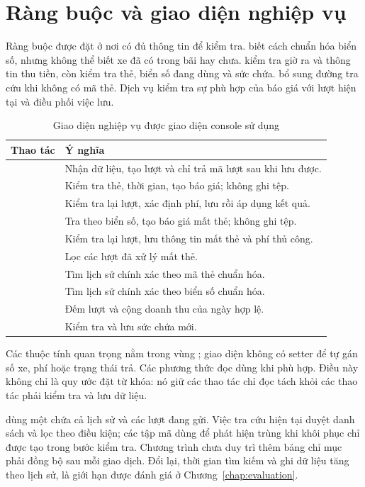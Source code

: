 \section{Ràng buộc và giao diện nghiệp vụ}
Ràng buộc được đặt ở nơi có đủ thông tin để kiểm tra.  biết cách chuẩn hóa biển số, nhưng không thể biết xe đã có trong bãi hay chưa.  kiểm tra giờ ra và thông tin thu tiền, còn  kiểm tra thẻ, biển số đang dùng và sức chứa.  bổ sung đường tra cứu khi không có mã thẻ. Dịch vụ kiểm tra sự phù hợp của báo giá với lượt hiện tại và điều phối việc lưu.

\begin{table}[H]
\centering\small
\caption{Giao diện nghiệp vụ được giao diện console sử dụng}
\label{tab:service-api}
\begin{tabularx}{\textwidth}{l Y}
\toprule
Thao tác & Ý nghĩa\\
\midrule
{} & Nhận dữ liệu, tạo lượt và chỉ trả mã lượt sau khi lưu được.\\
 & Kiểm tra thẻ, thời gian, tạo báo giá; không ghi tệp.\\
 & Kiểm tra lại lượt, xác định phí, lưu rồi áp dụng kết quả.\\
 & Tra theo biển số, tạo báo giá mất thẻ; không ghi tệp.\\
 & Kiểm tra lại lượt, lưu thông tin mất thẻ và phí thủ công.\\
 & Lọc các lượt đã xử lý mất thẻ.\\
 & Tìm lịch sử chính xác theo mã thẻ chuẩn hóa.\\
 & Tìm lịch sử chính xác theo biển số chuẩn hóa.\\
 & Đếm lượt và cộng doanh thu của ngày hợp lệ.\\
 & Kiểm tra và lưu sức chứa mới.\\
\bottomrule
\end{tabularx}
\end{table}

Các thuộc tính quan trọng nằm trong vùng ; giao diện không có setter để tự gán số xe, phí hoặc trạng thái trả. Các phương thức đọc dùng  khi phù hợp. Điều này không chỉ là quy ước đặt từ khóa: nó giữ các thao tác chỉ đọc tách khỏi các thao tác phải kiểm tra và lưu dữ liệu.

 dùng một  chứa cả lịch sử và các lượt đang gửi. Việc tra cứu hiện tại duyệt danh sách và lọc theo điều kiện; các tập mã dùng để phát hiện trùng khi khôi phục chỉ được tạo trong bước kiểm tra. Chương trình chưa duy trì thêm bảng chỉ mục phải đồng bộ sau mỗi giao dịch. Đổi lại, thời gian tìm kiếm và ghi dữ liệu tăng theo lịch sử, là giới hạn được đánh giá ở Chương~\ref{chap:evaluation}.
